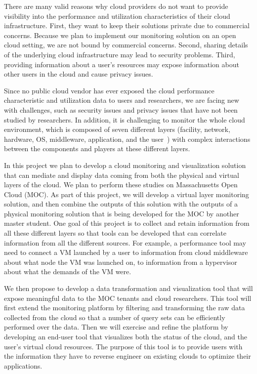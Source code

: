 There are many valid reasons why cloud providers do not want to provide visibility into the performance and utilization characteristics of their cloud infrastructure. First, they want to keep their solutions private due to commercial concerns. Because we plan to implement our monitoring solution on an open cloud setting, we are not bound by commercial concerns. Second, sharing details of the underlying cloud infrastructure may lead to security problems. Third, providing information about a user's resources may expose information about other users in the cloud and cause privacy issues. 

Since no public cloud vendor has ever exposed the cloud performance characteristic and utilization data to users and researchers, we are facing new with challenges, such as security issues and privacy issues that have not been studied by researchers. In addition, it is challenging to monitor the whole cloud environment, which is composed of seven different layers (facility, network, hardware, OS, middleware, application, and the user~\cite{spring2011monitoring}) with complex interactions between the components and players at these different layers. 

In this project we plan to develop a cloud monitoring and visualization solution that can mediate and display data coming from both the physical and virtual layers of the cloud. We plan to perform these studies on Massachusetts Open Cloud (MOC). As part of this project, we will develop a virtual layer monitoring solution, and then combine the outputs of this solution with the outputs of a physical monitoring solution that is being developed for the MOC by another master student. One goal of this project is to collect and retain information from all these different layers so that tools can be developed that can correlate information from all the different sources. For example, a performance tool may need to connect a VM launched by a user to information from cloud middleware about what node the VM was launched on, to information from a hypervisor about what the demands of the VM were. 

We then propose to develop a data transformation and visualization tool that will expose meaningful data to the MOC tenants and cloud researchers. This tool will first extend the monitoring platform by filtering and transforming the raw data collected from the cloud so that a number of query sets can be efficiently performed over the data. Then we will exercise and refine the platform by developing an end-user tool that visualizes both the status of the cloud, and the user’s virtual cloud resources. The purpose of this tool is to provide users with the information they have to reverse engineer on existing clouds to optimize their applications.

